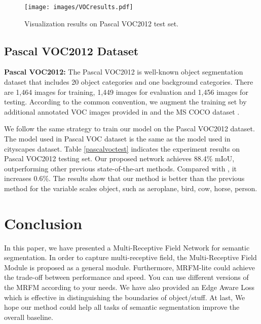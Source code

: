 \documentclass[final]{cvpr}
\begin{document}
\begin{figure}[ht]
\begin{center}
\texttt{[image: images/VOCresults.pdf]}
\end{center}
\caption{Visualization results on Pascal VOC2012 test set.}
\label{VOC test set visual}
\end{figure}


\subsection{Pascal VOC2012 Dataset}

\textbf{Pascal VOC2012:} The Pascal VOC2012 is well-known object segmentation dataset that includes 20 object categories and one background categories. There are 1,464 images for training, 1,449 images for evaluation and 1,456 images for testing. According to the common convention, we augment the training set by additional annotated VOC images provided in \cite{SBD} and the MS COCO dataset \cite{coco}.

We follow the same strategy to train our model on the Pascal VOC2012 dataset. The model used in Pascal VOC dataset is the same as the model used in cityscapes dataset. Table \ref{pascalvoctest} indicates the experiment results on Pascal VOC2012 testing set. Our proposed network achieves 88.4\% mIoU, outperforming other previous state-of-the-art methods. Compared with \cite{Deeplabv3+}, it increases 0.6\%. The results show that our method is better than the previous method for the variable scales object, such as aeroplane, bird, cow, horse, person.






\section{Conclusion}
In this paper, we have presented a Multi-Receptive Field Network for semantic segmentation. In order to capture multi-receptive field, the Multi-Receptive Field Module is proposed as a general module. Furthermore, MRFM-lite could achieve the trade-off between performance and speed. You can use different versions of the MRFM according to your needs. We have also provided an Edge Aware Loss which is effective in distinguishing the boundaries of object/stuff. At last, We hope our method could help all tasks of semantic segmentation improve the overall baseline. 




{\small


}
\end{document}

